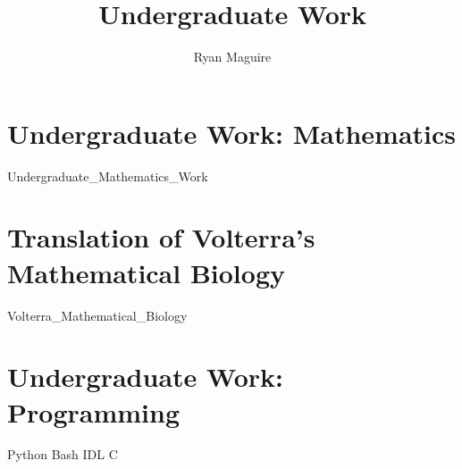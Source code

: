 \documentclass[crop=false,class=book,oneside]{standalone}
\begin{document}
    \newif\ifwork
    \ifstandalone
        \title{Undergraduate Work}
        \author{Ryan Maguire}
        \date{\vspace{-5ex}}
        \maketitle
        \tableofcontents
        \listoffigures
        \listoftables
        \clearpage
    \fi
    \part{Undergraduate Work: Mathematics}
        
                  {Undergraduate_Mathematics_Work}
    \part{Translation of Volterra's Mathematical Biology}
        
                  {Volterra_Mathematical_Biology}
    \part{Undergraduate Work: Programming}
        {Python}
        {Bash}
        {IDL}
        {C}
\end{document}
